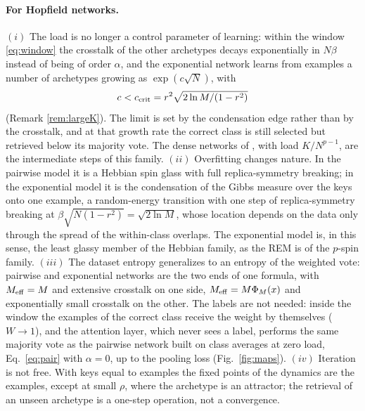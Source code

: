 \documentclass{SciPost}
\theoremstyle{plain}
\theoremstyle{definition}
\newcommand{\Meff}{M_{\rm eff}}
\begin{document}
\paragraph{For Hopfield networks.} $(i)$ The load is no longer a control parameter of learning: within the window \eqref{eq:window} the crosstalk of the other archetypes decays exponentially in $N\beta$ instead of being of order $\alpha$, and the exponential network learns from examples a number of archetypes growing as $\exp(c\sqrt N)$, with
\begin{equation*}
c<c_{\rm crit}=r^2\sqrt{2\ln M/(1-r^2)}
\end{equation*}
(Remark \ref{rem:largeK}). The limit is set by the condensation edge rather than by the crosstalk, and at that growth rate the correct class is still selected but retrieved below its majority vote. The dense networks of \cite{Agliari2023sup,Agliari2023unsup}, with load $K/N^{p-1}$, are the intermediate steps of this family. $(ii)$ Overfitting changes nature. In the pairwise model it is a Hebbian spin glass with full replica-symmetry breaking; in the exponential model it is the condensation of the Gibbs measure over the keys onto one example, a random-energy transition with one step of replica-symmetry breaking at $\beta\sqrt{N(1-r^2)}=\sqrt{2\ln M}$, whose location depends on the data only through the spread of the within-class overlaps. The exponential model is, in this sense, the least glassy member of the Hebbian family, as the REM is of the $p$-spin family. $(iii)$ The dataset entropy generalizes to an entropy of the weighted vote: pairwise and exponential networks are the two ends of one formula, with $\Meff=M$ and extensive crosstalk on one side, $\Meff=M\Phi_M(x)$ and exponentially small crosstalk on the other. The labels are not needed: inside the window the examples of the correct class receive the weight by themselves ($W\to1$), and the attention layer, which never sees a label, performs the same majority vote as the pairwise network built on class averages at zero load, Eq.\ \eqref{eq:pair} with $\alpha=0$, up to the pooling loss (Fig.\ \ref{fig:maps}). $(iv)$ Iteration is not free. With keys equal to examples the fixed points of the dynamics are the examples, except at small $\rho$, where the archetype is an attractor; the retrieval of an unseen archetype is a one-step operation, not a convergence.
\end{document}
